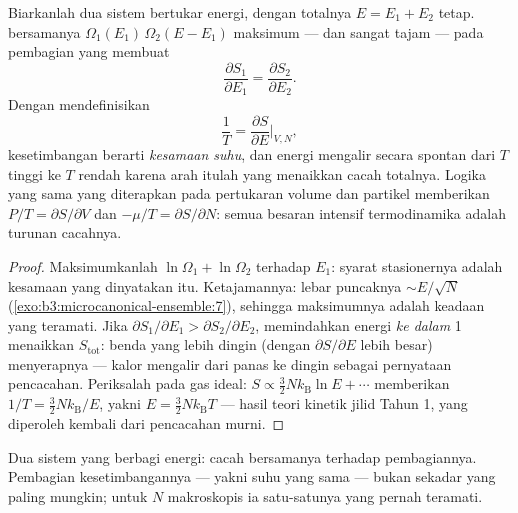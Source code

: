 \begin{theorem}\label{thm:b3:microcanonical-ensemble:temperature}
Biarkanlah dua sistem bertukar energi, dengan totalnya $E = E_1 + E_2$
tetap.  bersamanya $\Omega_1(E_1)\,\Omega_2(E - E_1)$
maksimum --- dan sangat tajam --- pada pembagian yang membuat
\[
\frac{\partial S_1}{\partial E_1} =
\frac{\partial S_2}{\partial E_2} .
\]
Dengan mendefinisikan
\[
\frac1T = \frac{\partial S}{\partial E}\bigg|_{V,N} ,
\]
kesetimbangan berarti \emph{kesamaan suhu}, dan energi mengalir secara
spontan dari $T$ tinggi ke $T$ rendah karena arah itulah yang menaikkan
cacah totalnya. Logika yang sama yang diterapkan pada pertukaran volume
dan partikel memberikan $P/T = \partial S/\partial V$ dan $-\mu/T
= \partial S/\partial N$: semua besaran intensif termodinamika
adalah turunan cacahnya.
\end{theorem}

\begin{proof}
Maksimumkanlah $\ln\Omega_1 + \ln\Omega_2$ terhadap $E_1$: syarat
stasionernya adalah kesamaan yang dinyatakan itu. Ketajamannya: lebar
puncaknya $\sim E/\sqrt N$ (\cref{exo:b3:microcanonical-ensemble:7}),
sehingga maksimumnya adalah keadaan yang teramati. Jika
$\partial S_1/\partial E_1 >
\partial S_2/\partial E_2$, memindahkan energi \emph{ke dalam} 1
menaikkan $S_{\text{tot}}$: benda yang lebih dingin (dengan
$\partial S/\partial E$ lebih besar) menyerapnya --- kalor mengalir dari
panas ke dingin sebagai pernyataan pencacahan. Periksalah pada gas ideal:
$S \propto \tfrac32 Nk_{\text{B}}\ln E + \cdots$ memberikan
$1/T = \tfrac32 Nk_{\text{B}}/E$, yakni $E = \tfrac32
Nk_{\text{B}}T$ --- hasil teori kinetik jilid Tahun 1, yang diperoleh
kembali dari pencacahan murni.
\end{proof}

\begin{omfigure}

{\small Dua sistem yang berbagi energi: cacah bersamanya terhadap
pembagiannya. Pembagian kesetimbangannya --- yakni suhu yang sama ---
bukan sekadar yang paling mungkin; untuk $N$ makroskopis ia satu-satunya
yang pernah teramati.}
\end{omfigure}

